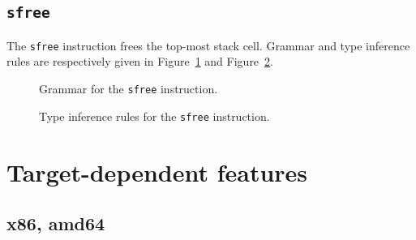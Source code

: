 \section{\texttt{sfree}}\label{sec:nstar-instructionset-sfree}

The \texttt{sfree} instruction frees the top-most stack cell.
Grammar and type inference rules are respectively given in Figure~\ref{fig:nstar-instructionset-sfree-grammar} and Figure~\ref{fig:nstar-instructionset-sfree-typerules}.

\begin{figure}[H]
  \centering


  \caption{Grammar for the \texttt{sfree} instruction.}
  \label{fig:nstar-instructionset-sfree-grammar}
\end{figure}

\begin{figure}[H]
  \centering


  \caption{Type inference rules for the \texttt{sfree} instruction.}
  \label{fig:nstar-instructionset-sfree-typerules}
\end{figure}

\chapter{Target-dependent features}\label{chap:nstar-specific}

\section{x86, amd64}\label{sec:nstar-specific-x86amd64}

